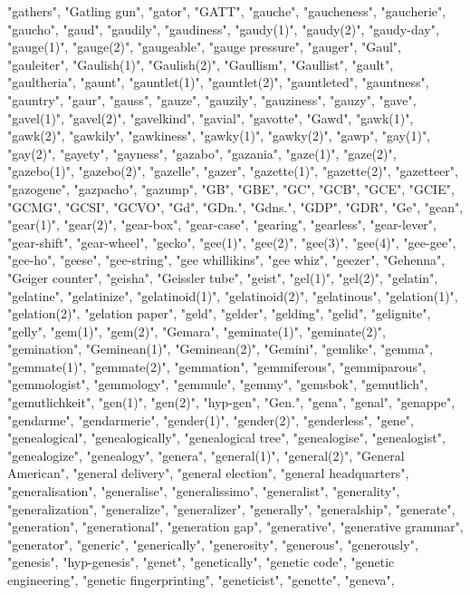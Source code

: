 "gathers",
"Gatling gun",
"gator",
"GATT",
"gauche",
"gaucheness",
"gaucherie",
"gaucho",
"gaud",
"gaudily",
"gaudiness",
"gaudy(1)",
"gaudy(2)",
"gaudy-day",
"gauge(1)",
"gauge(2)",
"gaugeable",
"gauge pressure",
"gauger",
"Gaul",
"gauleiter",
"Gaulish(1)",
"Gaulish(2)",
"Gaullism",
"Gaullist",
"gault",
"gaultheria",
"gaunt",
"gauntlet(1)",
"gauntlet(2)",
"gauntleted",
"gauntness",
"gauntry",
"gaur",
"gauss",
"gauze",
"gauzily",
"gauziness",
"gauzy",
"gave",
"gavel(1)",
"gavel(2)",
"gavelkind",
"gavial",
"gavotte",
"Gawd",
"gawk(1)",
"gawk(2)",
"gawkily",
"gawkiness",
"gawky(1)",
"gawky(2)",
"gawp",
"gay(1)",
"gay(2)",
"gayety",
"gayness",
"gazabo",
"gazania",
"gaze(1)",
"gaze(2)",
"gazebo(1)",
"gazebo(2)",
"gazelle",
"gazer",
"gazette(1)",
"gazette(2)",
"gazetteer",
"gazogene",
"gazpacho",
"gazump",
"GB",
"GBE",
"GC",
"GCB",
"GCE",
"GCIE",
"GCMG",
"GCSI",
"GCVO",
"Gd",
"GDn.",
"Gdns.",
"GDP",
"GDR",
"Ge",
"gean",
"gear(1)",
"gear(2)",
"gear-box",
"gear-case",
"gearing",
"gearless",
"gear-lever",
"gear-shift",
"gear-wheel",
"gecko",
"gee(1)",
"gee(2)",
"gee(3)",
"gee(4)",
"gee-gee",
"gee-ho",
"geese",
"gee-string",
"gee whillikins",
"gee whiz",
"geezer",
"Gehenna",
"Geiger counter",
"geisha",
"Geissler tube",
"geist",
"gel(1)",
"gel(2)",
"gelatin",
"gelatine",
"gelatinize",
"gelatinoid(1)",
"gelatinoid(2)",
"gelatinous",
"gelation(1)",
"gelation(2)",
"gelation paper",
"geld",
"gelder",
"gelding",
"gelid",
"gelignite",
"gelly",
"gem(1)",
"gem(2)",
"Gemara",
"geminate(1)",
"geminate(2)",
"gemination",
"Geminean(1)",
"Geminean(2)",
"Gemini",
"gemlike",
"gemma",
"gemmate(1)",
"gemmate(2)",
"gemmation",
"gemmiferous",
"gemmiparous",
"gemmologist",
"gemmology",
"gemmule",
"gemmy",
"gemsbok",
"gemutlich",
"gemutlichkeit",
"gen(1)",
"gen(2)",
"hyp-gen",
"Gen.",
"gena",
"genal",
"genappe",
"gendarme",
"gendarmerie",
"gender(1)",
"gender(2)",
"genderless",
"gene",
"genealogical",
"genealogically",
"genealogical tree",
"genealogise",
"genealogist",
"genealogize",
"genealogy",
"genera",
"general(1)",
"general(2)",
"General American",
"general delivery",
"general election",
"general headquarters",
"generalisation",
"generalise",
"generalissimo",
"generalist",
"generality",
"generalization",
"generalize",
"generalizer",
"generally",
"generalship",
"generate",
"generation",
"generational",
"generation gap",
"generative",
"generative grammar",
"generator",
"generic",
"generically",
"generosity",
"generous",
"generously",
"genesis",
"hyp-genesis",
"genet",
"genetically",
"genetic code",
"genetic engineering",
"genetic fingerprinting",
"geneticist",
"genette",
"geneva",
